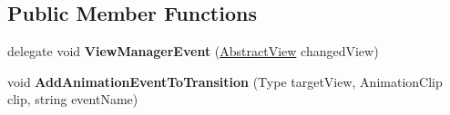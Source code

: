 \subsection*{Public Member Functions}
\begin{DoxyCompactItemize}
\item 
\hypertarget{class_scaffolding_1_1_view_manager_base_ad47faade879ba9cfe1624960d0a48e25}{delegate void {\bfseries View\+Manager\+Event} (\hyperlink{class_scaffolding_1_1_abstract_view}{Abstract\+View} changed\+View)}\label{class_scaffolding_1_1_view_manager_base_ad47faade879ba9cfe1624960d0a48e25}

\item 
\hypertarget{class_scaffolding_1_1_view_manager_base_a178a05fc2bb3a02de223a09def5d9efc}{void {\bfseries Add\+Animation\+Event\+To\+Transition} (Type target\+View, Animation\+Clip clip, string event\+Name)}\label{class_scaffolding_1_1_view_manager_base_a178a05fc2bb3a02de223a09def5d9efc}


\end{DoxyCompactItemize}
